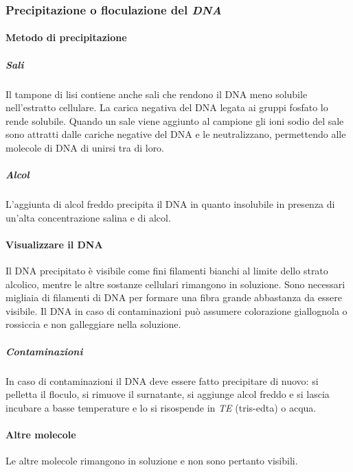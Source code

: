 		\subsubsection{Precipitazione o floculazione del \emph{DNA}}
			\paragraph{Metodo di precipitazione}
				\subparagraph{Sali}
				Il tampone di lisi contiene anche sali che rendono il DNA meno solubile nell'estratto cellulare.
				La carica negativa del DNA legata ai gruppi fosfato lo rende solubile.
				Quando un sale viene aggiunto al campione gli ioni sodio del sale sono attratti dalle cariche negative del DNA e le neutralizzano, permettendo alle molecole di DNA di unirsi tra di loro.
				
				\subparagraph{Alcol}
				L'aggiunta di alcol freddo precipita il DNA in quanto insolubile in presenza di un'alta concentrazione salina e di alcol.

			\paragraph{Visualizzare il DNA}
			Il DNA precipitato \`e visibile come fini filamenti bianchi al limite dello strato alcolico, mentre le altre sostanze cellulari rimangono in soluzione.
			Sono necessari migliaia di filamenti di DNA per formare una fibra grande abbastanza da essere visibile.
			Il DNA in caso di contaminazioni pu\`o assumere colorazione giallognola o rossiccia e non galleggiare nella soluzione. 
				
				\subparagraph{Contaminazioni}
				In caso di contaminazioni il DNA deve essere fatto precipitare di nuovo: si pelletta il floculo, si rimuove il surnatante, si aggiunge alcol freddo e si lascia incubare
				a basse temperature e lo si risospende in \emph{TE} (tris-edta) o acqua.
		
			\paragraph{Altre molecole}
			Le altre molecole rimangono in soluzione e non sono pertanto visibili.


		


